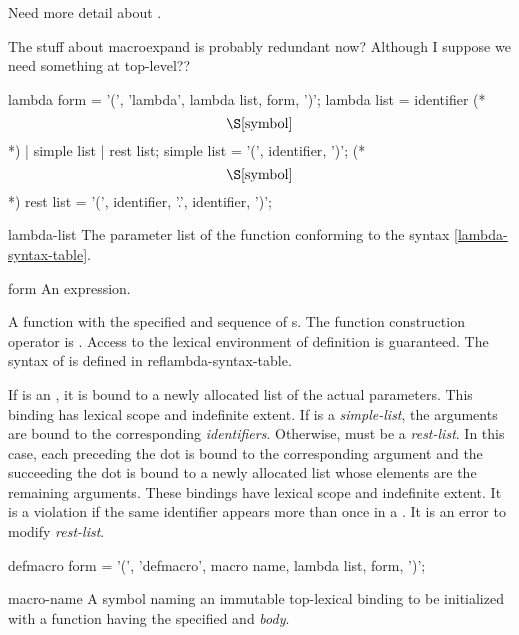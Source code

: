 \label{function}
%
\begin{optPrivate}
    Need more detail about .

    The stuff about macroexpand is probably redundant now?  Although I
    suppose we need something at top-level??
\end{optPrivate}
%
\begin{optDefinition}
%
%
\Syntax
\label{lambda-syntax-table}
\savesyntax\lambdaSyntax\vbox{\syntax
lambda form
   = '(', 'lambda', lambda list, {form}, ')';
lambda list
   = identifier     (* \[\S\ref{symbol}\] *)
   | simple list
   | rest list;
simple list
   = '(', {identifier}, ')';   (* \[\S\ref{symbol}\] *)
rest list
   = '(', {identifier}, '.', identifier, ')';
\endsyntax}
%
\begin{arguments}
    \item[lambda-list] The parameter list of the function conforming to the
    syntax \ref{lambda-syntax-table}.
    \item[form] An expression.
\end{arguments}
%
\result%
A function with the specified  and sequence of s.
%
\remarks%
The function construction operator is .  Access to the
lexical environment of definition is guaranteed.  The syntax of 
is defined in ref{lambda-syntax-table}.

If  is an , it is bound to a newly allocated
list of the actual parameters.  This binding  has lexical scope and indefinite extent.  If
 is a {\em simple-list}, the arguments are bound to the
corresponding {\em identifiers}.  Otherwise,  must be a {\em
    rest-list}.  In this case, each  preceding the dot is bound
to the corresponding argument and the  succeeding the dot is
bound to a newly allocated list whose elements are the remaining arguments.
These bindings have lexical scope and indefinite extent.  It is a violation
if the same identifier appears more than once in a .  It is an
error to modify {\em rest-list}.

%
\Syntax
\savesyntax{}\vbox{\syntax
defmacro form
   = '(', 'defmacro', macro name, lambda list,
     {form}, ')';
\endsyntax}
%
\begin{arguments}
    \item[macro-name] A symbol naming an immutable top-lexical binding to be
    initialized with a function having the specified  and {\em
        body}.


\end{arguments}
\end{optDefinition}
